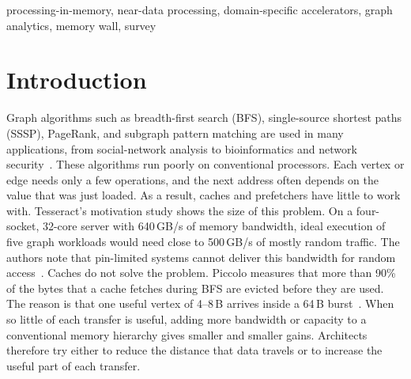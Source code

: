 \documentclass[journal,onecolumn]{IEEEtran}
\begin{document}
\begin{IEEEkeywords}
processing-in-memory, near-data processing, domain-specific accelerators, graph analytics, memory wall, survey
\end{IEEEkeywords}

\section{Introduction}
Graph algorithms such as breadth-first search (BFS), single-source shortest paths (SSSP), PageRank, and subgraph pattern matching are used in many applications, from social-network analysis to bioinformatics and network security~\cite{ahn2015tesseract,ham2016graphicionado,asquini2025tc}. These algorithms run poorly on conventional processors. Each vertex or edge needs only a few operations, and the next address often depends on the value that was just loaded. As a result, caches and prefetchers have little to work with. Tesseract's motivation study shows the size of this problem. On a four-socket, 32-core server with 640\,GB/s of memory bandwidth, ideal execution of five graph workloads would need close to 500\,GB/s of mostly random traffic. The authors note that pin-limited systems cannot deliver this bandwidth for random access~\cite{ahn2015tesseract}. Caches do not solve the problem. Piccolo measures that more than 90\% of the bytes that a cache fetches during BFS are evicted before they are used. The reason is that one useful vertex of 4--8\,B arrives inside a 64\,B burst~\cite{shin2025piccolo}. When so little of each transfer is useful, adding more bandwidth or capacity to a conventional memory hierarchy gives smaller and smaller gains. Architects therefore try either to reduce the distance that data travels or to increase the useful part of each transfer.
\end{document}
